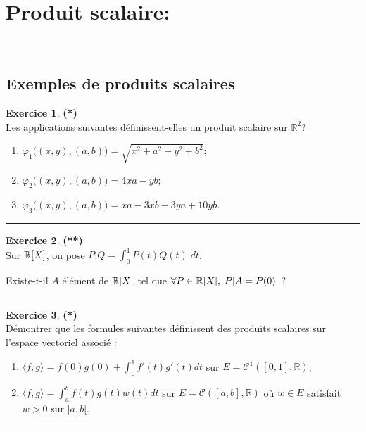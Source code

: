 \documentclass[a4paper,11pt]{article}
\theoremstyle{definition}
\newtheorem{exo}{Exercice} %
\begin{document}
\section*{Produit scalaire:}\hfill\\%

   
\begin{minipage}{1\linewidth}\begin{minipage}[t]{0.48\linewidth}\raggedright

\subsection*{Exemples de produits scalaires}

	
\begin{exo}\textbf{(*)}\quad\\[0.2cm]
Les applications suivantes définissent-elles un produit scalaire sur $\mathbb R^2$?
\begin{enumerate}
	\item $\varphi_1\big((x,y),(a,b)\big)=\sqrt{x^2+a^2+y^2+b^2}$;
	\item $\varphi_2\big((x,y),(a,b)\big)=4xa-yb$;
	\item $\varphi_3\big((x,y),(a,b)\big)=xa-3xb-3ya+10yb$.
\end{enumerate}

	
\centering\rule{1\linewidth}{0.6pt}\end{exo}


\begin{exo}\textbf{(**)}\quad\\[0.2cm]
	Sur $\mathbb{R}[X]$, on pose $P|Q=\int_{0}^{1}P(t)Q(t)\;dt$. 
	
	Existe-t-il $A$ élément de $\mathbb{R}[X]$ tel que $\forall P\in\mathbb{R}[X],\;P|A=P(0)$~?
	
	\centering\rule{1\linewidth}{0.6pt}\end{exo}



\end{minipage}\hfill\vrule\hfill\begin{minipage}[t]{0.48\linewidth}\raggedright

\begin{exo}\textbf{(*)}\quad\\[0.2cm]
Démontrer que les formules suivantes définissent des produits scalaires sur l'espace vectoriel associé :
\begin{enumerate}
	\item $\langle f,g\rangle=f(0)g(0)+\int_0^1 f'(t)g'(t)dt$ sur $E=\mathcal C^1([0,1],\mathbb R)$;
	\item $\langle f,g\rangle=\int_a^b f(t)g(t)w(t)dt$ sur $E=\mathcal C([a,b],\mathbb R)$ où $w\in E$ satisfait $w>0$ sur $]a,b[$.
\end{enumerate}
\centering\rule{1\linewidth}{0.6pt}\end{exo}


\end{minipage}
\end{minipage}
\end{document}
